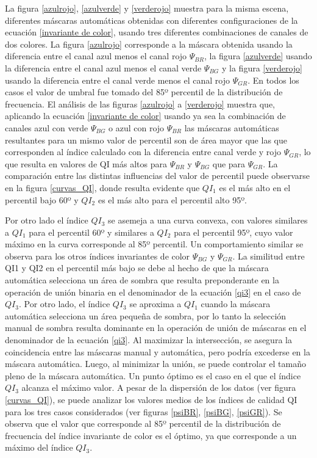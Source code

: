 La figura \ref{azulrojo}, \ref{azulverde} y \ref{verderojo} muestra para la misma escena, diferentes máscaras automáticas obtenidas con diferentes configuraciones de la ecuación \ref{invariante de color}, usando tres diferentes combinaciones de canales de dos colores. La figura \ref{azulrojo} corresponde a la máscara obtenida usando la diferencia entre el canal azul menos el canal rojo $\Psi_{BR}$, la figura \ref{azulverde} usando la diferencia entre el canal azul menos el canal verde $\Psi_{BG}$ y la figura \ref{verderojo} usando la diferencia entre el canal verde menos el canal rojo $\Psi_{GR}$. En todos los casos el valor de umbral fue tomado del 85º percentil de la distribución de frecuencia. El análisis de las figuras \ref{azulrojo} a \ref{verderojo} muestra que, aplicando la ecuación \ref{invariante de color} usando ya sea la combinación de canales azul con verde $\Psi_{BG}$ o azul con rojo $\Psi_{BR}$  las máscaras automáticas resultantes para un mismo valor de percentil son de área mayor que las que corresponden al índice calculado con la diferencia entre canal verde y rojo $\Psi_{GR}$, lo que resulta en valores de QI más altos para $\Psi_{BR}$ y $\Psi_{BG}$ que para $\Psi_{GR}$. La comparación entre las distintas influencias del valor de percentil puede observarse en la figura \ref{curvas_QI}, donde resulta evidente que $QI_1$ es el más alto en el percentil bajo 60º y $QI_2$ es el más alto para el percentil alto 95º. 

Por otro lado el índice $QI_3$ se asemeja a una curva convexa, con valores similares a $QI_1$ para el percentil 60º y similares a $QI_2$ para el percentil 95º, cuyo valor máximo en la curva corresponde al 85º percentil. Un comportamiento similar se observa para los otros índices invariantes de color $\Psi_{BG}$ y $\Psi_{GR}$. La similitud entre QI1 y QI2 en el percentil más bajo se debe al hecho de que la máscara automática selecciona un área de sombra que resulta preponderante en la operación de unión binaria en el denominador de la ecuación \ref{qi3} en el caso de $QI_3$.
Por otro lado, el índice $QI_3$ se aproxima a $QI_1$ cuando la máscara automática selecciona un área pequeña de sombra, por lo tanto la selección manual de sombra resulta dominante en la operación de unión de máscaras en el denominador de la ecuación \ref{qi3}.
Al maximizar la intersección, se asegura la coincidencia entre las máscaras manual y automática, pero podría excederse en la máscara automática. Luego, al minimizar la unión, se puede controlar el tamaño pleno de la máscara automática. Un punto óptimo es el caso en el que el índice $QI_3$ alcanza el máximo valor. A pesar de la dispersión de los datos (ver figura \ref{curvas_QI}), se puede analizar los valores medios de los índices de calidad QI para los tres casos considerados (ver figuras \ref{psiBR}, \ref{psiBG}, \ref{psiGR}). Se observa que el valor que corresponde al 85º percentil de la distribución de frecuencia del índice invariante de color es el óptimo, ya que corresponde a un máximo del índice $QI_3$.

